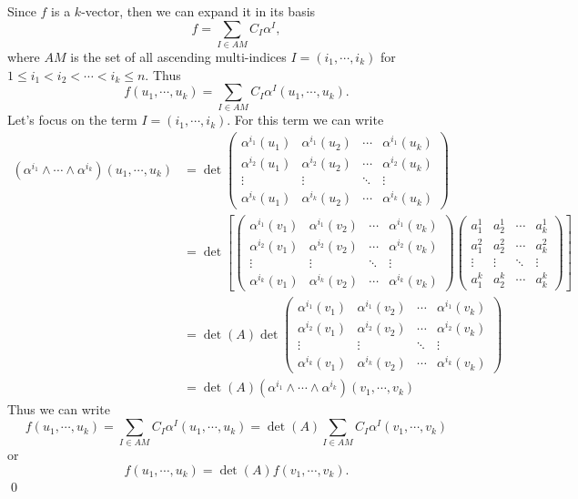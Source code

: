 \begin{solution}
	Since $ f $ is a $ k $-vector, then we can expand it in its basis
	\[ f = \sum_{I \in AM} C_I \alpha^I, \]
	where $ AM $ is the set of all ascending multi-indices $ I = (i_1,\cdots,i_k) $ for $ 1 \leq i_1 < i_2 < \cdots < i_k \leq n $. Thus
	\[ f(u_1,\cdots,u_k) = \sum_{I \in AM} C_I \alpha^I (u_1,\cdots,u_k). \]
	Let's focus on the term $ I = (i_1,\cdots,i_k) $. For this term we can write
	\begin{align*}
		(\alpha^{i_1} \wedge \cdots \wedge \alpha^{i_k})(u_1,\cdots,u_k) 
		&= \det\begin{pmatrix}
			\alpha^{i_1}(u_1) & \alpha^{i_1}(u_2) & \cdots & \alpha^{i_1}(u_k) \\
			\alpha^{i_2}(u_1) & \alpha^{i_2}(u_2) & \cdots & \alpha^{i_2}(u_k) \\
			\vdots & \vdots & \ddots & \vdots \\
			\alpha^{i_k}(u_1) & \alpha^{i_k}(u_2) & \cdots & \alpha^{i_k}(u_k)
		\end{pmatrix}\\
		&= \det \left[
		\begin{pmatrix}
			\alpha^{i_1}(v_1) & \alpha^{i_1}(v_2) & \cdots & \alpha^{i_1}(v_k) \\
			\alpha^{i_2}(v_1) & \alpha^{i_2}(v_2) & \cdots & \alpha^{i_2}(v_k) \\
			\vdots & \vdots & \ddots & \vdots \\
			\alpha^{i_k}(v_1) & \alpha^{i_k}(v_2) & \cdots & \alpha^{i_k}(v_k)
		\end{pmatrix}
		\begin{pmatrix}
			a^1_1 & a^1_2 & \cdots & a^1_k \\
			a^2_1 & a^2_2 & \cdots & a^2_k \\
			\vdots & \vdots & \ddots & \vdots \\
			a^k_1 & a^k_2 & \cdots & a^k_k
			\end{pmatrix}
		\right]\\
		&= \det (A) \det \begin{pmatrix}
			\alpha^{i_1}(v_1) & \alpha^{i_1}(v_2) & \cdots & \alpha^{i_1}(v_k) \\
			\alpha^{i_2}(v_1) & \alpha^{i_2}(v_2) & \cdots & \alpha^{i_2}(v_k) \\
			\vdots & \vdots & \ddots & \vdots \\
			\alpha^{i_k}(v_1) & \alpha^{i_k}(v_2) & \cdots & \alpha^{i_k}(v_k)
		\end{pmatrix}\\
		&= \det(A) (\alpha^{i_1} \wedge \cdots \wedge \alpha^{i_k})(v_1,\cdots,v_k) 
	\end{align*}
	Thus we can write
	\[f(u_1,\cdots,u_k) = \sum_{I \in AM} C_I \alpha^I (u_1,\cdots,u_k) =  \det(A) \sum_{I \in AM} C_I \alpha^I (v_1,\cdots,v_k) \]
	or
	\[ \boxed{f(u_1,\cdots,u_k) = \det(A) f(v_1,\cdots,v_k).} \]
	\qed
\end{solution}


